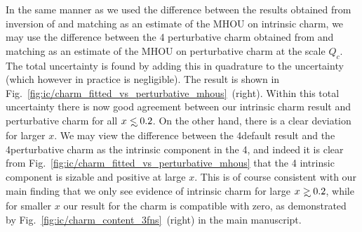 In the same manner as we used the difference between the results obtained from
inversion of \nnlo and \nnnlo  matching as an estimate of the MHOU on
intrinsic charm, we may use the difference between the 4\fns
 perturbative charm obtained from \nnlo and \nnnlo matching as an
 estimate of the MHOU on perturbative charm at the scale $Q_c$.
 The total uncertainty is found by adding
 this in quadrature to the \pdf uncertainty (which however in practice
 is negligible).
%
The result is shown in 
Fig.~\ref{fig:ic/charm_fitted_vs_perturbative_mhous}~(right).
Within this total uncertainty there is now good agreement between our
intrinsic charm result and perturbative charm for all
$x\lsim 0.2$. On the other hand, there is a clear deviation for larger
$x$. We may view the difference between the 4\fns default result
and the 4\fns perturbative  charm as the intrinsic component in the
4\fns, and indeed it is clear from
Fig.~\ref{fig:ic/charm_fitted_vs_perturbative_mhous} that the 4\fns
intrinsic component is sizable and positive at large $x$.
%
This is of course consistent with our main finding that we
only see evidence of intrinsic charm for large $x\gsim 0.2$, while for
smaller $x$ our result for the charm \pdf is compatible with zero, as demonstrated by
Fig.~\ref{fig:ic/charm_content_3fns}~(right) in the main manuscript.

